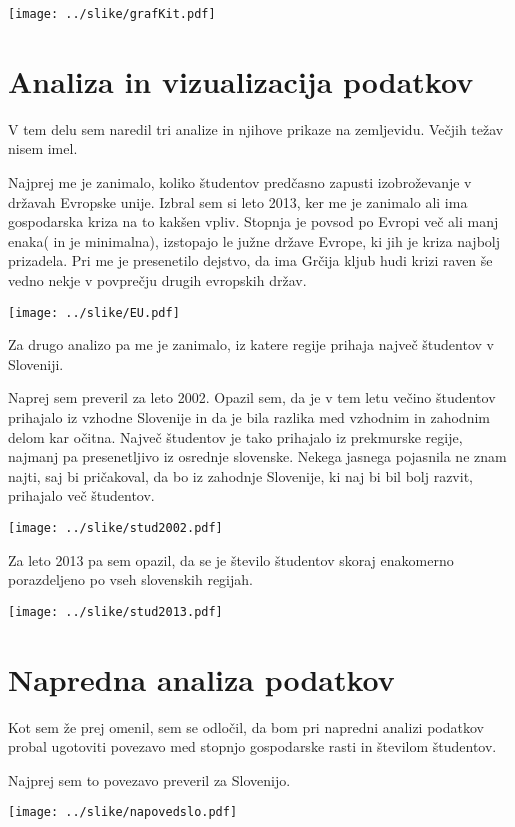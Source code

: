 \documentclass[11pt,a4paper]{article}
\begin{document}
\texttt{[image: ../slike/grafKit.pdf]}

\section{Analiza in vizualizacija podatkov} 

V tem delu sem naredil tri analize in njihove prikaze na zemljevidu. Večjih težav nisem imel. 

Najprej me je zanimalo, koliko študentov predčasno zapusti izobroževanje v državah Evropske unije. Izbral sem si leto 2013, ker me je zanimalo ali ima gospodarska kriza na to kakšen vpliv. Stopnja je povsod po Evropi več ali manj enaka( in je minimalna), izstopajo le južne države Evrope, ki jih je kriza najbolj prizadela. Pri me je presenetilo dejstvo, da ima Grčija kljub hudi krizi raven še vedno nekje v povprečju drugih evropskih držav. 

\texttt{[image: ../slike/EU.pdf]}

Za drugo analizo pa me je zanimalo, iz katere regije prihaja največ študentov v Sloveniji. 

Naprej sem preveril za leto 2002. Opazil sem, da je v tem letu večino študentov prihajalo iz vzhodne Slovenije in da je bila razlika med vzhodnim in zahodnim delom kar očitna. Največ študentov je tako prihajalo iz prekmurske regije, najmanj pa presenetljivo iz osrednje slovenske. Nekega jasnega pojasnila ne znam najti, saj bi pričakoval, da bo iz zahodnje Slovenije, ki naj bi bil bolj razvit, prihajalo več študentov. 

\texttt{[image: ../slike/stud2002.pdf]}

 Za leto 2013 pa sem opazil, da se je število študentov skoraj enakomerno porazdeljeno po vseh slovenskih regijah. 
 
\texttt{[image: ../slike/stud2013.pdf]} 

\section{Napredna analiza podatkov} 

Kot sem že prej omenil, sem se odločil, da bom pri napredni analizi podatkov probal ugotoviti povezavo med stopnjo gospodarske rasti in številom študentov. 

Najprej sem to povezavo preveril za Slovenijo. 

\texttt{[image: ../slike/napovedslo.pdf]} 
\end{document}
